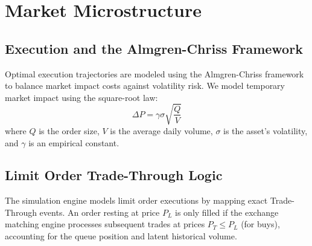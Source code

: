 \chapter{Market Microstructure}
\section{Execution and the Almgren-Chriss Framework}
Optimal execution trajectories are modeled using the Almgren-Chriss framework to balance market impact costs against volatility risk. We model temporary market impact using the square-root law: 
\begin{equation}
\Delta P = \gamma \sigma \sqrt{\frac{Q}{V}}
\end{equation}
where $Q$ is the order size, $V$ is the average daily volume, $\sigma$ is the asset's volatility, and $\gamma$ is an empirical constant.
\section{Limit Order Trade-Through Logic}
The simulation engine models limit order executions by mapping exact Trade-Through events. An order resting at price $P_L$ is only filled if the exchange matching engine processes subsequent trades at prices $P_T \leq P_L$ (for buys), accounting for the queue position and latent historical volume.
